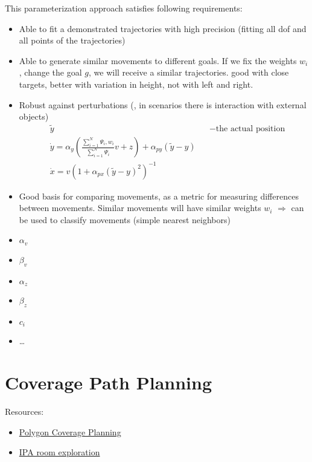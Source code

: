 This parameterization approach satisfies following requirements: 
\begin{itemize}
	\item Able to fit a demonstrated trajectories with high precision (fitting all \ac{dof} and all points of the trajectories)
	\item Able to generate similar movements to different goals. If we fix the weights $w_i$, change the goal $g$, we will receive a similar trajectories. \note good with close targets, better with variation in height, not with left and right.
	\item Robust against perturbations (\eg, in scenarios there is interaction with external objects)
	\begin{align}
		&\tilde{y} &&-\text{the actual position}\\
		&\dot{y} = \alpha_y \left( \frac{\sum_{i=1}^N \Psi_i, w_i}{\sum_{i=1}^N \Psi_i} v + z \right) + \alpha_{py} (\tilde{y} - y)\\
		&\dot{x} = v \left( 1+ \alpha_{px}(\tilde{y}-y)^2 \right) ^{-1}
	\end{align}
	\item Good basis for comparing movements, as a metric for measuring differences between movements. Similar movements will have similar weights $w_i$ $\Rightarrow$ can be used to classify movements (simple nearest neighbors)
\end{itemize}

\begin{itemize}
	\item $\alpha_v$
	\item $\beta_v$
	\item $\alpha_z$
	\item $\beta_z$
	\item $c_i$
	\item \dots
\end{itemize}

\section{Coverage Path Planning}
Resources:
\begin{itemize}
	\item \href{https://github.com/ethz-asl/polygon_coverage_planning}{Polygon Coverage Planning}
	\item \href{http://wiki.ros.org/ipa_room_exploration}{IPA room exploration}
\end{itemize}
